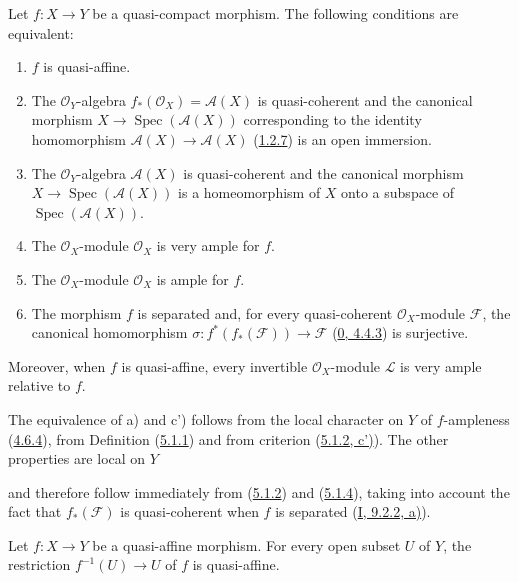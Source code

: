 \begin{proposition}[5.1.6]
\label{II.5.1.6}
Let $f:X\to Y$ be a quasi-compact morphism. The following conditions are
equivalent:
\begin{enumerate}
  \item[\rm{a)}] $f$ is quasi-affine.
  \item[\rm{b)}] The $\mathcal{O}_Y$-algebra
  $f_*(\mathcal{O}_X)=\mathcal{A}(X)$ is quasi-coherent and the canonical
  morphism $X\to\operatorname{Spec}(\mathcal{A}(X))$ corresponding to
  the identity homomorphism $\mathcal{A}(X)\to\mathcal{A}(X)$
  (\hyperref[II.1.2.7]{1.2.7}) is an open immersion.
  \item[\rm{b')}] The $\mathcal{O}_Y$-algebra $\mathcal{A}(X)$ is
  quasi-coherent and the canonical morphism
  $X\to\operatorname{Spec}(\mathcal{A}(X))$ is a homeomorphism of $X$
  onto a subspace of $\operatorname{Spec}(\mathcal{A}(X))$.
  \item[\rm{c)}] The $\mathcal{O}_X$-module $\mathcal{O}_X$ is very ample
  for $f$.
  \item[\rm{c')}] The $\mathcal{O}_X$-module $\mathcal{O}_X$ is ample for
  $f$.
  \item[\rm{d)}] The morphism $f$ is separated and, for every
  quasi-coherent $\mathcal{O}_X$-module $\mathcal{F}$, the canonical
  homomorphism $\sigma:f^*(f_*(\mathcal{F}))\to\mathcal{F}$
  (\hyperref[0.4.4.3]{0, 4.4.3}) is surjective.
\end{enumerate}
Moreover, when $f$ is quasi-affine, every invertible $\mathcal{O}_X$-module
$\mathcal{L}$ is very ample relative to $f$.
\end{proposition}

The equivalence of a) and c') follows from the local character on $Y$ of
$f$-ampleness (\hyperref[II.4.6.4]{4.6.4}), from Definition
(\hyperref[II.5.1.1]{5.1.1}) and from criterion
(\hyperref[II.5.1.2]{5.1.2, c')}). The other properties are local on
$Y$


and therefore follow immediately from (\hyperref[II.5.1.2]{5.1.2}) and
(\hyperref[II.5.1.4]{5.1.4}), taking into account the fact that
$f_*(\mathcal{F})$ is quasi-coherent when $f$ is separated
(\hyperref[I.9.2.2]{I, 9.2.2, a)}).

\begin{corollary}[5.1.7]
\label{II.5.1.7}
Let $f:X\to Y$ be a quasi-affine morphism. For every open subset $U$ of $Y$,
the restriction $f^{-1}(U)\to U$ of $f$ is quasi-affine.
\end{corollary}

